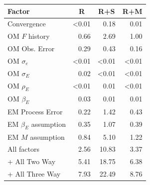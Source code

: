 \begin{center}
\begin{tabular}{lrrr}
\hline\hline
\multicolumn{1}{l}{Factor}&\multicolumn{1}{c}{R}&\multicolumn{1}{c}{R+S}&\multicolumn{1}{c}{R+M}\tabularnewline
\hline
Convergence&\textless  0.01& 0.18& 0.01\tabularnewline
OM $F$ history& 0.66& 2.69& 1.00\tabularnewline
OM Obs. Error& 0.29& 0.43& 0.16\tabularnewline
OM $\sigma_e$&\textless  0.01&\textless  0.01&\textless  0.01\tabularnewline
OM $\sigma_E$& 0.02&\textless  0.01&\textless  0.01\tabularnewline
OM $\rho_{E}$&\textless  0.01& 0.01&\textless  0.01\tabularnewline
OM $\beta_{E}$& 0.03& 0.01& 0.01\tabularnewline
EM Process Error& 0.22& 1.42& 0.43\tabularnewline
EM $\beta_{E}$ assumption& 0.35& 1.07& 0.39\tabularnewline
EM $M$ assumption& 0.84& 5.10& 1.22\tabularnewline
All factors& 2.56&10.83& 3.37\tabularnewline
+ All Two Way& 5.41&18.75& 6.38\tabularnewline
+ All Three Way& 7.93&22.49& 8.76\tabularnewline
\hline
\end{tabular}\end{center}
